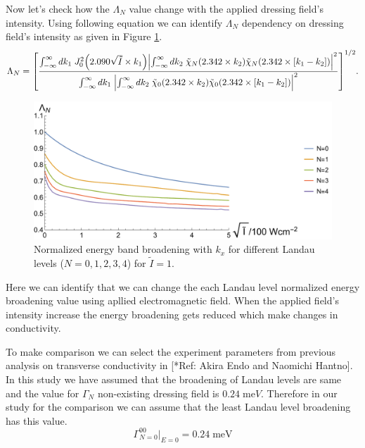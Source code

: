 \noindent
Now let's check how the $\Lambda_N$ value change with the applied dressing field's intensity. Using following equation we can identify $\Lambda_N$ dependency on dressing field's intensity as given in Figure \ref{fig:5.2}.
\begin{equation} \label{5.29}
    \Lambda_N  =
    \qty[
    \frac
    {\int_{-\infty}^{\infty} d {k}_1 \;
    J_0^2\qty(2.090\sqrt{\tilde{I}}\times{k}_1)
    \qty|
    \int_{-\infty}^{\infty} d{k}_2 \;
    \tilde{\chi}_{N}\qty(2.342 \times k_2)
    \tilde{\chi}_{N}\qty(2.342 \times \qty[{k}_1 - {k}_2])|^2}
    {\int_{-\infty}^{\infty} d {k}_1 \;
    \qty|
    \int_{-\infty}^{\infty} d{k}_2 \;
    \tilde{\chi}_{0}\qty(2.342 \times k_2)
    \tilde{\chi}_{0}\qty(2.342 \times \qty[{k}_1 - {k}_2])|^2}
    ]^{1/2}.
\end{equation}

\begin{figure}[ht!]
  \centering
  \includegraphics[scale=0.6]{figures/fig52.pdf}
  \caption{Normalized energy band broadening with $k_x$ for different Landau levels ($N=0,1,2,3,4$) for $\tilde{I}=1$.}
  \label{fig:5.2}
\end{figure}

\noindent
Here we can identify that we can change the each Landau level normalized energy broadening value using apllied electromagnetic field. When the applied field's intensity increase the energy broadening gets reduced which make changes in conductivity.

\noindent
To make comparison we can select the experiment parameters from previous analysis on transverse conductivity in [*Ref: Akira Endo and Naomichi Hantno]. In this study we have assumed that the broadening of Landau levels are same and the value for $\Gamma_N$ non-existing dressing field is $0.24\;\text{me}V$. Therefore in our study for the comparison we can assume that the least Landau level broadening has this value.
\begin{equation} \label{5.30}
  \Gamma^{00}_{N=0}\big|_{E=0} = 0.24 \;\text{meV}
\end{equation}

